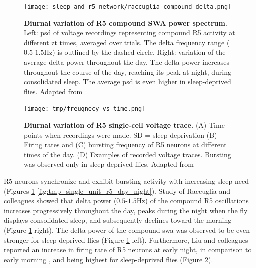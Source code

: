\documentclass[../main.tex]{subfiles}
\begin{document}
\begin{figure}[!b]
    \centering
    \texttt{[image: sleep\_and\_r5\_network/raccuglia\_compound\_delta.png]}
    \caption[Diurnal variation of R5 compound SWA power spectrum]{
        \textbf{Diurnal variation of R5 compound SWA power spectrum}.
        Left: \gls{psd} of voltage recordings representing compound R5 activity at different \gls{zt} times, averaged over trials. The delta frequency range ($0.5$-$1.5$Hz) is outlined by the dashed circle. Right: variation of the average delta power throughout the day. The delta power increases throughout the course of the day, reaching its peak at night, during consolidated sleep. The average \gls{psd} is even higher in sleep-deprived flies.
        Adapted from \parencite{raccugliaNetworkSpecificSynchronizationElectrical2019}
    }
    \label{fig:raccuglia_compound_delta_oscillations}
\end{figure}

\begin{figure}[!b]
    \centering
    \texttt{[image: tmp/freuqnecy\_vs\_time.png]}
    \caption[Diurnal variation of R5 single-cell voltage trace.]{
        \textbf{Diurnal variation of R5 single-cell voltage trace.}
        (A) Time points when recordings were made. SD = sleep deprivation (B) Firing rates and (C) bursting frequency of R5 neurons at different times of the day. (D) Examples of recorded voltage traces. Bursting was observed only in sleep-deprived flies. Adapted from \parencite{liuSleepDriveEncoded2016}
    }
    \label{fig:tmp_frequency_vs_zt}
\end{figure}

R5 neurons synchronize and exhibit bursting activity with increasing sleep need \parencite{raccugliaNetworkSpecificSynchronizationElectrical2019,liuSleepDriveEncoded2016}
(Figures \ref{fig:raccuglia_compound_delta_oscillations}-\ref{fig:tmp_single_unit_r5_day_night}).
Study of Raccuglia and colleagues showed that delta power ($0.5$-$1.5$Hz) of the compound R5 oscillations increases progressively throughout the day, peaks during the night when the fly displays consolidated sleep, and subsequently declines toward the morning \parencite{raccugliaNetworkSpecificSynchronizationElectrical2019} (Figure \ref{fig:raccuglia_compound_delta_oscillations} right).
The delta power of the compound \gls{swa} was observed to be even stronger for sleep-deprived flies (Figure \ref{fig:raccuglia_compound_delta_oscillations} left). Furthermore, Liu and colleagues reported an increase in firing rate of R5 neurons at early night, in comparison to early morning \parencite{liuSleepDriveEncoded2016}, and being highest for sleep-deprived flies (Figure \ref{fig:tmp_frequency_vs_zt}).
\end{document}
